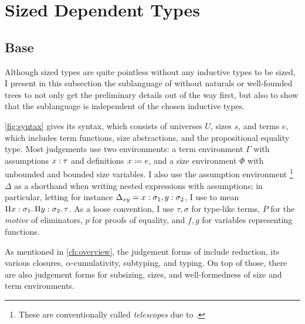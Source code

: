 \chapter{Sized Dependent Types} \label{ch:sized-dep-types}




\section{Base \lang}

Although sized types are quite pointless without any inductive types to be sized,
I present in this subsection the sublanguage of \lang without naturals or well-founded trees
to not only get the preliminary details out of the way first,
but also to show that the sublanguage is independent of the chosen inductive types.

\cref{fig:syntax} gives its syntax, which consists of universes $U$,
sizes $s$, and terms $e$, which includes term functions, size abstractions,
and the propositional equality type.
Most judgements use two environments: a term environment $\Gamma$ with assumptions $x \mathrel{:} \tau$
and definitions $x \mathrel{\coloneqq} e$, and a size environment $\Phi$ with unbounded and bounded size variables.
I also use the assumption environment%
\footnote{These are conventionally called \emph{telescopes} due to \citet{telescope}.}
$\Delta$ as a shorthand when writing nested expressions with assumptions;
in particular, letting for instance $\Delta_{xy} = x \mathrel{:} \sigma_1, y \mathrel{:} \sigma_2$,
I use  to mean $\Pi x \mathrel{:} \sigma_1 \mathpunct{.} \Pi y \mathrel{:} \sigma_2 \mathpunct{.} \tau$.
As a loose convention, I use $\tau, \sigma$ for type-like terms,
$P$ for the \emph{motive} of eliminators,
$p$ for proofs of equality, and
$f, g$ for variables representing functions.

As mentioned in \cref{ch:overview}, the judgement forms of \lang include
reduction, its various closures, $\alpha$-cumulativity, subtyping, and typing.
On top of those, there are also judgement forms for subsizing, sizes,
and well-formedness of size and term environments.

